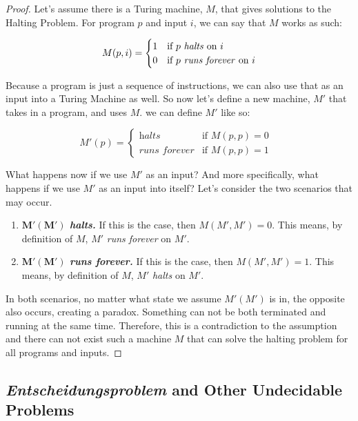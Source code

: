 \documentclass[12pt]{article}
\begin{document}
\begin{proof}
Let's assume there is a Turing machine, $M$, that gives solutions to the Halting Problem. For program $p$ and input $i$, we can say that $M$ works as such:

\[
M(p,i) =  
\begin{cases} 
      1 & \text{if $p$ \textit{halts} on $i$} \\
      0 & \text{if $p$ \textit{runs forever} on $i$}
   \end{cases}
\]

\noindent Because a program is just a sequence of instructions, we can also use that as an input into a Turing Machine as well. So now let's define a new machine, $M'$ that takes in a program, and uses $M$. we can define $M'$ like so:

\[
M'(p) =  
\begin{cases} 
      \textit{halts} & \text{if $M(p,p) = 0$ } \\
      \textit{runs forever} & \text{if $M(p,p) = 1$}
   \end{cases}
\]

\noindent What happens now if we use $M'$ as an input? And more specifically, what happens if we use $M'$ as an input into itself? Let's consider the two scenarios that may occur.

\begin{enumerate}

\item \textbf{$\boldsymbol{M'(M')}$ \textit{halts.}} If this is the case, then $M(M',M')=0$. This means, by definition of $M$, $M'$ \textit{runs forever} on $M'$.
\item \textbf{$\boldsymbol{M'(M')}$ \textit{runs forever.}} If this is the case, then $M(M',M')=1$. This means, by definition of $M$, $M'$ \textit{halts} on $M'$.

\end{enumerate}

In both scenarios, no matter what state we assume $M'(M')$ is in, the opposite also occurs, creating a paradox. Something can not be both terminated and running at the same time.  Therefore, this is a contradiction to the assumption and there can not exist such a machine $M$ that can solve the halting problem for all programs and inputs.
\end{proof}

\subsection{\textit{Entscheidungsproblem} and Other Undecidable Problems}
\end{document}
